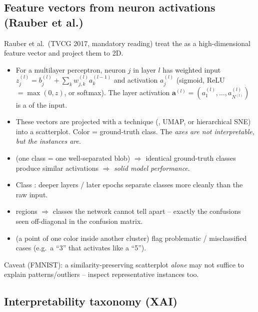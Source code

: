 \subsection{Feature vectors from neuron activations (Rauber et al.)}

Rauber et al.\ (TVCG 2017, mandatory reading) treat the  as a high-dimensional feature vector and project them to 2D.

\begin{itemize}
  \item For a multilayer perceptron, neuron $j$ in layer $l$ has weighted input
    $z_j^{(l)} = b_j^{(l)} + \sum_k w_{j,k}^{(l)} a_k^{(l-1)}$ and activation
    $a_j^{(l)}$ (sigmoid, ReLU $=\max(0,z)$, or softmax). The layer activation
    $\mathbf{a}^{(l)} = (a_1^{(l)},\dots,a_{N^{(l)}}^{(l)})$ is a
     of the input.
  \item These vectors are projected with a 
    technique (, UMAP, or hierarchical SNE) into a scatterplot.
    Color = ground-truth class. The \emph{axes are not interpretable, but the
    instances are}.
\end{itemize}

\begin{keybox}
\begin{itemize}
  \item {} (one class = one well-separated blob)
    $\Rightarrow$ identical ground-truth classes produce similar activations
    $\Rightarrow$ \emph{solid model performance}.
  \item Class : deeper
    layers / later epochs separate classes more cleanly than the raw input.
  \item {} regions $\Rightarrow$ classes the
    network cannot tell apart -- exactly the confusions seen off-diagonal in the
    confusion matrix.
  \item {} (a point of one color inside another cluster)
    flag problematic / misclassified cases (e.g.\ a ``3'' that activates like a ``5'').
\end{itemize}
Caveat (FMNIST): a similarity-preserving scatterplot \emph{alone} may not
suffice to explain patterns/outliers -- inspect representative instances too.
\end{keybox}

\subsection{Interpretability taxonomy (XAI)}


